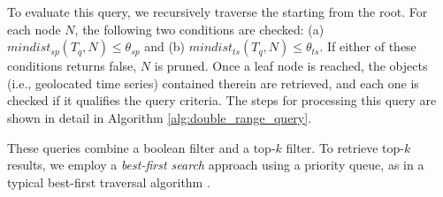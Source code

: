 To evaluate this query, we recursively traverse the \tsr starting from the root. For each node $N$, the following two conditions are checked: (a) $mindist_{sp}(T_q, N) \leq \theta_{sp}$ and (b) $mindist_{ts}(T_q, N) \leq \theta_{ts}$. If either of these conditions returns false, $N$ is pruned. Once a leaf node is reached, the objects (i.e., geolocated time series) contained therein are retrieved, and each one is checked if it qualifies the query criteria. The steps for processing this query are shown in detail in Algorithm \ref{alg:double_range_query}.

\begin{algorithm}[!t]
\begin{small}
	\DontPrintSemicolon
	\caption{$Q_{bb}(T_q, \theta_{sp}, \theta_{ts})$}
	\label{alg:double_range_query}
\end{small}		
\end{algorithm}


\label{subsubsec:range_topk}

These queries combine a boolean filter and a top-$k$ filter. To retrieve top-$k$ results, we employ a \textit{best-first search} approach using a priority queue, as in a typical best-first traversal algorithm \cite{hjaltason99tods}.

